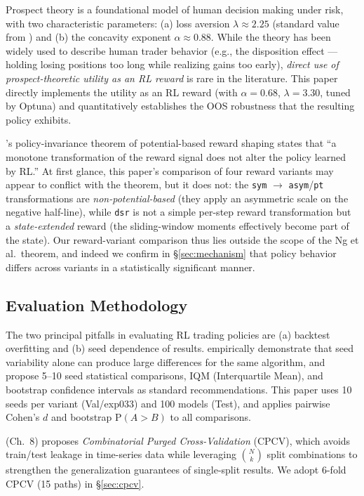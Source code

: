 \documentclass[11pt, a4paper]{article}
\begin{document}
Prospect theory \citep{kahneman1979prospect} is a foundational model of
human decision making under risk, with two characteristic parameters:
(a) loss aversion $\lambda \approx 2.25$ (standard value from
\citealt{tversky1992cumulative}) and (b) the concavity exponent
$\alpha \approx 0.88$. While the theory has been widely used to describe
human trader behavior (e.g., the disposition effect — holding losing positions
too long while realizing gains too early), \emph{direct use of
prospect-theoretic utility as an RL reward} is rare in the literature. This paper directly implements the
\citet{kahneman1979prospect} utility as an RL reward (with $\alpha=0.68$,
$\lambda=3.30$, tuned by Optuna) and quantitatively establishes the OOS
robustness that the resulting policy exhibits.

\citet{ng1999reward}'s policy-invariance theorem of potential-based reward
shaping states that ``a monotone transformation of the reward signal does not
alter the policy learned by RL.'' At first glance, this paper's comparison of
four reward variants may appear to conflict with the theorem, but it does not:
the \texttt{sym} $\to$ \texttt{asym}/\texttt{pt} transformations are
\emph{non-potential-based} (they apply an asymmetric scale on the negative
half-line), while \texttt{dsr} is not a simple per-step reward transformation
but a \emph{state-extended} reward (the sliding-window moments effectively
become part of the state). Our reward-variant comparison thus lies outside the
scope of the Ng et al.\ theorem, and indeed we confirm in
\S\ref{sec:mechanism} that policy behavior differs across variants in a
statistically significant manner.

\subsection{Evaluation Methodology}
\label{sec:related_eval}

The two principal pitfalls in evaluating RL trading policies are (a) backtest
overfitting and (b) seed dependence of results.
\citet{henderson2018rlreproducibility} empirically demonstrate that seed
variability alone can produce large differences for the same algorithm, and
propose 5--10 seed statistical comparisons, IQM (Interquartile Mean), and
bootstrap confidence intervals as standard recommendations. This paper uses
10 seeds per variant (Val/exp033) and 100 models (Test), and applies pairwise
Cohen's $d$ and bootstrap $\mathrm{P}(A>B)$ to all comparisons.

\citet{lopezdeprado2018advances} (Ch.\ 8) proposes \emph{Combinatorial Purged
Cross-Validation} (CPCV), which avoids train/test leakage in time-series data
while leveraging $\binom{N}{k}$ split combinations to strengthen the
generalization guarantees of single-split results. We adopt 6-fold CPCV
(15 paths) in \S\ref{sec:cpcv}.
\end{document}

